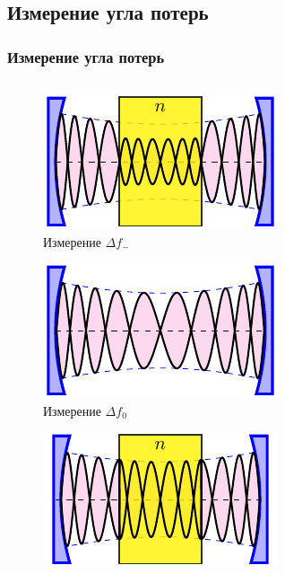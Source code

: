 \subsection{Измерение угла потерь}
\begin{frame}[c]%
	\frametitle{Измерение угла потерь}
	\vspace{-0.5em}
	\begin{columns}[c]
		\begin{column}{0.49\textwidth}%
			\vspace{-0.7em}
			\begin{figure}[H]
				\centering
				\includegraphics[width=0.6\linewidth]{ris/f-}
				\caption{Измерение $\Delta f_-$}
				\label{fig:chem}
			\end{figure}
			\vspace{-2.5em}
			\begin{figure}[H]
				\centering
				\includegraphics[width=0.6\linewidth]{ris/f0}
				\caption{Измерение $\Delta f_0$}
				\label{fig:chem}
			\end{figure}
			\vspace{-2.5em}
			\begin{figure}[H]
				\centering
				\includegraphics[width=0.6\linewidth]{ris/f+}

\end{figure}
\end{column}
\end{columns}
\end{frame}
